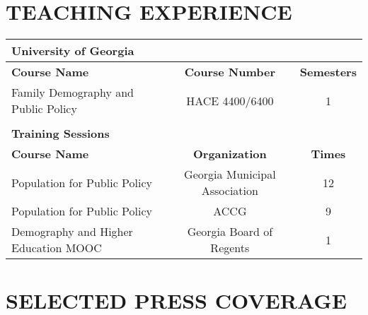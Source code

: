 \documentclass[letterpaper,11pt]{article}
\begin{document}
\section{TEACHING EXPERIENCE}
\begin{tabularx}{\linewidth}{l c c}
\textbf{University of Georgia} & & \\
\hline
\textbf{Course Name} & \textbf{Course Number} & \textbf{Semesters} \\
Family Demography and Public Policy & HACE 4400/6400 & 1\\
 & &\\
\textbf{Training Sessions} & & \\
\hline
\textbf{Course Name} & \textbf{Organization} & \textbf{Times} \\
Population for Public Policy & Georgia Municipal Association & 12\\
Population for Public Policy & ACCG & 9\\
Demography and Higher Education MOOC & Georgia Board of Regents & 1\\
\hline
\end{tabularx}



\section{SELECTED PRESS COVERAGE}


\end{document}
